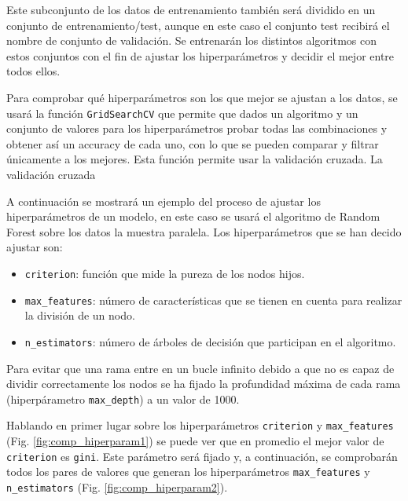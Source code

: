 Este subconjunto de los datos de entrenamiento también será dividido en un conjunto de entrenamiento/test, aunque en este caso el conjunto test recibirá el nombre de  conjunto de validación. Se entrenarán los distintos algoritmos con estos conjuntos con el fin de ajustar los hiperparámetros y decidir el mejor entre todos ellos.

Para comprobar qué hiperparámetros son los que mejor se ajustan a los datos, se usará la función \texttt{GridSearchCV} \cite{scikitgrid} que permite que dados un algoritmo y un conjunto de valores para los hiperparámetros probar todas las combinaciones y obtener así un accuracy de cada uno, con lo que se pueden comparar y filtrar únicamente a los mejores. Esta función permite usar la validación cruzada. La validación cruzada 

A continuación se mostrará un ejemplo del proceso de ajustar los hiperparámetros de un modelo, en este caso se usará el algoritmo de Random Forest sobre los datos la muestra paralela. Los hiperparámetros que se han decido ajustar son:
\begin{itemize}
    \item \texttt{criterion}: función que mide la pureza de los nodos hijos.
    \item \texttt{max\_features}: número de características que se tienen en cuenta para realizar la división de un nodo.
    \item \texttt{n\_estimators}: número de árboles de decisión que participan en el algoritmo.
\end{itemize}

Para evitar que una rama entre en un bucle infinito debido a que no es capaz de dividir correctamente los nodos se ha fijado la profundidad máxima de cada rama (hiperpárametro \texttt{max\_depth}) a un valor de 1000. 

Hablando en primer lugar sobre los hiperparámetros \texttt{criterion} y \texttt{max\_features} (Fig. \ref{fig:comp_hiperparam1}) se puede ver que en promedio el mejor valor de \texttt{criterion} es \texttt{gini}. Este parámetro será fijado y, a continuación, se comprobarán todos los pares de valores que generan los hiperparámetros \texttt{max\_features} y \texttt{n\_estimators} (Fig. \ref{fig:comp_hiperparam2}).

